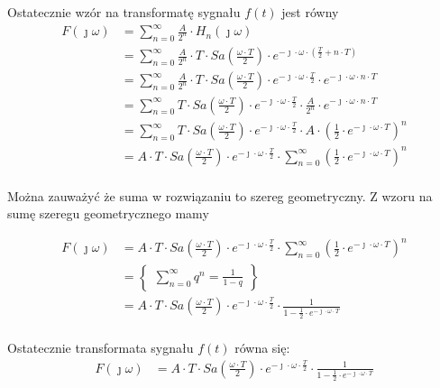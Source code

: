 \begin{task}
Ostatecznie wzór na transformatę sygnału $f(t)$ jest równy 
\begin{align*}
F(\jmath\omega) &= \sum_{n=0}^{\infty}  \frac{A}{2^{n}}\cdot H_{n}(\jmath\omega)\\
&=\sum_{n=0}^{\infty}  \frac{A}{2^{n}}\cdot T \cdot Sa\left(\frac{\omega \cdot T}{2}\right) \cdot e^{-\jmath \cdot \omega \cdot \left(\frac{T}{2} + n\cdot T\right)}\\
&=\sum_{n=0}^{\infty}  \frac{A}{2^{n}}\cdot T \cdot Sa\left(\frac{\omega \cdot T}{2}\right) \cdot e^{-\jmath \cdot \omega \cdot \frac{T}{2}} \cdot e^{-\jmath \cdot \omega \cdot n\cdot T}\\
&=\sum_{n=0}^{\infty} T \cdot Sa\left(\frac{\omega \cdot T}{2}\right) \cdot e^{-\jmath \cdot \omega \cdot \frac{T}{2}} \cdot  \frac{A}{2^{n}}\cdot e^{-\jmath \cdot \omega \cdot n\cdot T}\\
&=\sum_{n=0}^{\infty} T \cdot Sa\left(\frac{\omega \cdot T}{2}\right) \cdot e^{-\jmath \cdot \omega \cdot \frac{T}{2}} \cdot  A \cdot \left(\frac{1}{2}\cdot e^{-\jmath \cdot \omega \cdot T}\right)^n\\
&=A \cdot T \cdot Sa\left(\frac{\omega \cdot T}{2}\right) \cdot e^{-\jmath \cdot \omega \cdot \frac{T}{2}} \cdot  \sum_{n=0}^{\infty} \left(\frac{1}{2}\cdot e^{-\jmath \cdot \omega \cdot T}\right)^n\\
\end{align*}

Można zauważyć że suma w rozwiązaniu to szereg geometryczny. Z wzoru na sumę szeregu geometrycznego mamy

\begin{align*}
F(\jmath\omega) &=A \cdot T \cdot Sa\left(\frac{\omega \cdot T}{2}\right) \cdot e^{-\jmath \cdot \omega \cdot \frac{T}{2}} \cdot  \sum_{n=0}^{\infty} \left(\frac{1}{2}\cdot e^{-\jmath \cdot \omega \cdot T}\right)^n\\
&=\begin{Bmatrix}
\sum_{n=0}^{\infty}q^n = \frac{1}{1-q}
\end{Bmatrix}\\
&=A \cdot T \cdot Sa\left(\frac{\omega \cdot T}{2}\right) \cdot e^{-\jmath \cdot \omega \cdot \frac{T}{2}} \cdot \frac{1}{1 - \frac{1}{2}\cdot e^{-\jmath \cdot \omega \cdot T}}\\
\end{align*}

Ostatecznie transformata sygnału $f(t)$ równa się:
\begin{align*}
F(\jmath\omega) &=A \cdot T \cdot Sa\left(\frac{\omega \cdot T}{2}\right) \cdot e^{-\jmath \cdot \omega \cdot \frac{T}{2}} \cdot \frac{1}{1 - \frac{1}{2}\cdot e^{-\jmath \cdot \omega \cdot T}}
\end{align*}

\end{task}


